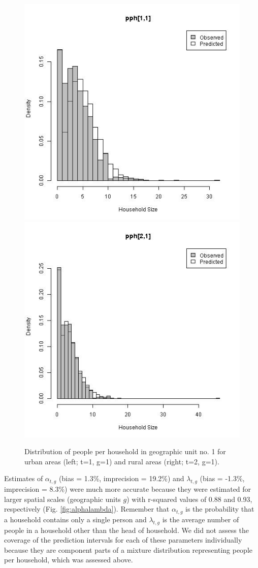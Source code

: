 \documentclass[]{book}
\begin{document}
\begin{figure}
\includegraphics[width=0.5\linewidth]{dat/GHAv1/N/Nhat_1_1} \includegraphics[width=0.5\linewidth]{dat/GHAv1/N/Nhat_2_1} \caption{Distribution of people per household in geographic unit  no. 1 for urban areas (left; t=1, g=1) and rural areas (right; t=2, g=1).}\label{fig:pph}
\end{figure}

Estimates of \(\alpha_{t,g}\) (bias = 1.3\%, imprecision = 19.2\%) and
\(\lambda_{t,g}\) (bias = -1.3\%, imprecision = 8.3\%) were much more
accurate because they were estimated for larger spatial scales
(geographic units \(g\)) with r-squared values of 0.88 and 0.93,
respectively (Fig. \ref{fig:alphalambda}). Remember that
\(\alpha_{t,g}\) is the probability that a household contains only a
single person and \(\lambda_{t,g}\) is the average number of people in a
household other than the head of household. We did not assess the
coverage of the prediction intervals for each of these parameters
individually because they are component parts of a mixture distribution
representing people per household, which was assessed above.
\end{document}
